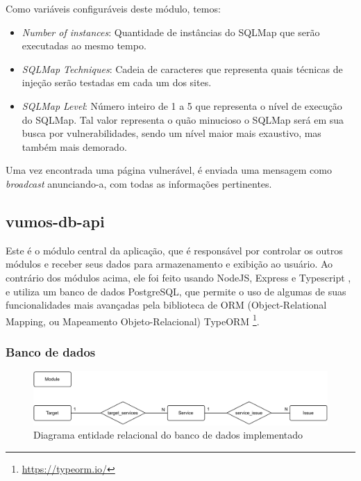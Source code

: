     Como variáveis configuráveis deste módulo, temos:
    \begin{itemize}
        \item \emph{Number of instances}: Quantidade de instâncias do SQLMap que serão executadas ao mesmo tempo.
        \item \emph{SQLMap Techniques}: Cadeia de caracteres que representa quais técnicas de injeção serão testadas em cada um dos sites.
        \item \emph{SQLMap Level}: Número inteiro de 1 a 5 que representa o nível de execução do SQLMap. Tal valor representa o quão minucioso o SQLMap será em sua busca por vulnerabilidades, sendo um nível maior mais exaustivo, mas também mais demorado.
    \end{itemize}
    
    Uma vez encontrada uma página vulnerável, é enviada uma mensagem como \textit{broadcast} anunciando-a, com todas as informações pertinentes.


    \subsection{vumos-db-api}
    
    Este é o módulo central da aplicação, que é responsável por controlar os outros módulos e receber seus dados para armazenamento e exibição ao usuário. Ao contrário dos módulos acima, ele foi feito usando NodeJS, Express e Typescript , e utiliza um banco de dados PostgreSQL, que permite o uso de algumas de suas funcionalidades mais avançadas pela biblioteca de ORM (Object-Relational Mapping, ou Mapeamento Objeto-Relacional) TypeORM \footnote{\url{https://typeorm.io/}}. 
    
    \subsubsection{Banco de dados}
    
    \begin{figure}[H]
        \includegraphics[scale=0.8]{figuras/vumos-db-api-mer.drawio.pdf}
        \caption{Diagrama entidade relacional do banco de dados implementado \label{fig:vumos-db-mer}}
    \end{figure}
    
